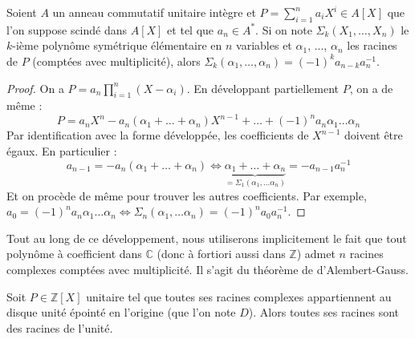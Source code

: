 




	\begin{lemma}
		\label{theoreme-de-kronecker-1}
		Soient $A$ un anneau commutatif unitaire intègre et $P = \sum_{i=1}^n a_iX^i \in A[X]$ que l'on suppose scindé dans $A[X]$ et tel que $a_n \in A^*$. Si on note $\Sigma_k(X_1, \dots, X_n)$ le $k$-ième polynôme symétrique élémentaire en $n$ variables et $\alpha_1$, ..., $\alpha_n$ les racines de $P$ (comptées avec multiplicité), alors $\Sigma_k(\alpha_1, \dots, \alpha_n) = (-1)^k a_{n-k} a_n^{-1}$.
	\end{lemma}

	\begin{proof}
		On a $P = a_n \prod_{i=1}^n (X-\alpha_i)$. En développant partiellement $P$, on a de même :
		\[ P = a_n X^n - a_n (\alpha_1 + \dots + \alpha_n)X^{n-1} + \dots + (-1)^n a_n \alpha_1 \dots \alpha_n \]
		Par identification avec la forme développée, les coefficients de $X^{n-1}$ doivent être égaux. En particulier :
		\[ a_{n-1} = -a_n (\alpha_1 + \dots + \alpha_n) \iff \underbrace{\alpha_1 + \dots + \alpha_n}_{= \Sigma_1(\alpha_1, \dots \alpha_n)} = - a_{n-1} a_n^{-1} \]
		Et on procède de même pour trouver les autres coefficients. Par exemple, $a_0 = (-1)^n a_n \alpha_1 \dots \alpha_n \iff \Sigma_n(\alpha_1, \dots \alpha_n) = (-1)^n a_0 a_n^{-1}$.
	\end{proof}

	\begin{remark}
		Tout au long de ce développement, nous utiliserons implicitement le fait que tout polynôme à coefficient dans $\mathbb{C}$ (donc à fortiori aussi dans $\mathbb{Z}$) admet $n$ racines complexes comptées avec multiplicité. Il s'agit du théorème de d'Alembert-Gauss.
	\end{remark}


	\begin{theorem}[Kronecker]
		\label{theoreme-de-kronecker-2}
		Soit $P \in \mathbb{Z}[X]$ unitaire tel que toutes ses racines complexes appartiennent au disque unité épointé en l'origine (que l'on note $D$). Alors toutes ses racines sont des racines de l'unité.
	\end{theorem}

